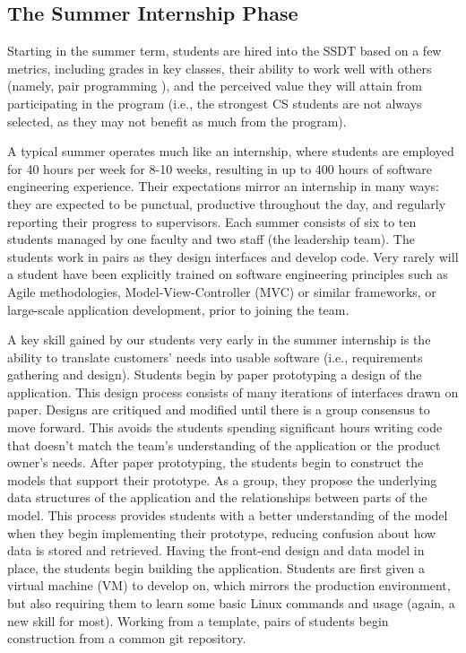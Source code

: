 \subsection{The Summer Internship Phase}
Starting in the summer term, students are hired into the SSDT based on a few metrics, including grades in key classes, their ability to work well with others (namely, pair programming \cite{2002PairProgramming}), and the perceived value they will attain from participating in the program (i.e., the strongest CS students are not always selected, as they may not benefit as much from the program).

A typical summer operates much like an internship, where students are employed for 40 hours per week for 8-10 weeks, resulting in up to 400 hours of software engineering experience. Their expectations mirror an internship in many ways: they are expected to be punctual, productive throughout the day, and regularly reporting their progress to supervisors. Each summer consists of six to ten students managed by one faculty and two staff (the leadership team). The students work in pairs as they design interfaces and develop code. Very rarely will a student have been explicitly trained on software engineering principles such as Agile methodologies, Model-View-Controller (MVC) or similar frameworks, or large-scale application development, prior to joining the team.

A key skill gained by our students very early in the summer internship is the ability to translate customers' needs into usable software (i.e., requirements gathering and design). Students begin by paper prototyping \cite{2003paperPrototype} a design of the application. This design process consists of many iterations of interfaces drawn on paper. Designs are critiqued and modified until there is a group consensus to move forward. This avoids the students spending significant hours writing code that doesn’t match the team’s understanding of the application or the product owner’s needs. After paper prototyping, the students begin to construct the models that support their prototype. As a group, they propose the underlying data structures of the application and the relationships between parts of the model. This process provides students with a better understanding of the model when they begin implementing their prototype, reducing confusion about how data is stored and retrieved. Having the front-end design and data model in place, the students begin building the application. Students are first given a virtual machine (VM) to develop on, which mirrors the production environment, but also requiring them to learn some basic Linux commands and usage (again, a new skill for most). Working from a template, pairs of students begin construction from a common git repository.

